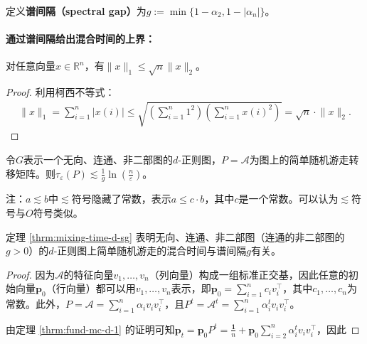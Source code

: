 \documentclass[lang=cn,newtx,10pt,scheme=chinese,chinesefont=nofont,citestyle=gb7714-2015, bibstyle=gb7714-2015]{elegantbook}
\begin{document}
\begin{refsection}
    定义\textbf{谱间隔（spectral gap）}为$g:=\min\{1-\alpha_2,1-|\alpha_n|\}$。

    \paragraph{通过谱间隔给出混合时间的上界：}

    \begin{fact}
        \label{fact:norm}
        对任意向量$x\in\mathbb{R}^n$，有$\lVert x\rVert_1\le \sqrt{n}\lVert x\rVert_2$。
        \begin{proof}
            利用柯西不等式：
            \begin{align*}
                \lVert x\rVert_1=\sum_{i=1}^n{|x(i)|}
                \le \sqrt{\left(\sum_{i=1}^n{1^2}\right)\left(\sum_{i=1}^n{x(i)^2}\right)}
                =\sqrt{n}\cdot \lVert x\rVert_2.
            \end{align*}
        \end{proof}
    \end{fact}
                
    \begin{theorem}
        \label{thrm:mixing-time-d-sg}
        令$G$表示一个无向、连通、非二部图的$d$-正则图，$P=\mathcal{A}$为图上的简单随机游走转移矩阵。则$\tau_{\varepsilon}(P)\lesssim\frac{1}{g}\ln{\left(\frac{n}{\varepsilon}\right)}$。
    \end{theorem}

    注：$a \lesssim b$中$\lesssim$符号隐藏了常数，表示$a\le c\cdot b$，其中$c$是一个常数。可以认为$\lesssim$符号与$O$符号类似。

    定理 \ref{thrm:mixing-time-d-sg} 表明无向、连通、非二部图（连通的非二部图的$g>0$）的$d$-正则图上简单随机游走的混合时间与谱间隔$g$有关。

    \begin{proof}
        因为$\mathcal{A}$的特征向量$v_1,\dots,v_n$（列向量）构成一组标准正交基，因此任意的初始向量$\bm{p}_0$（行向量）都可以用$v_1,\dots,v_n$表示，即$\bm{p}_0=\sum_{i=1}^n{c_iv_i^{\top}}$，其中$c_1,\dots,c_n$为常数。此外，$P=\mathcal{A}=\sum_{i=1}^n{\alpha_iv_iv_i^{\top}}$，且$P^t=\mathcal{A}^t=\sum_{i=1}^n{\alpha_i^tv_iv_i^{\top}}$。%
        
        由定理 \ref{thrm:fund-mc-d-1} 的证明可知$\bm{p}_t=\bm{p}_0P^t=\frac{\bm{1}}{n}+\bm{p}_0\sum_{i=2}^n{\alpha_i^tv_iv_i^{\top}}$，因此
                    

\end{proof}
\end{refsection}
\end{document}
